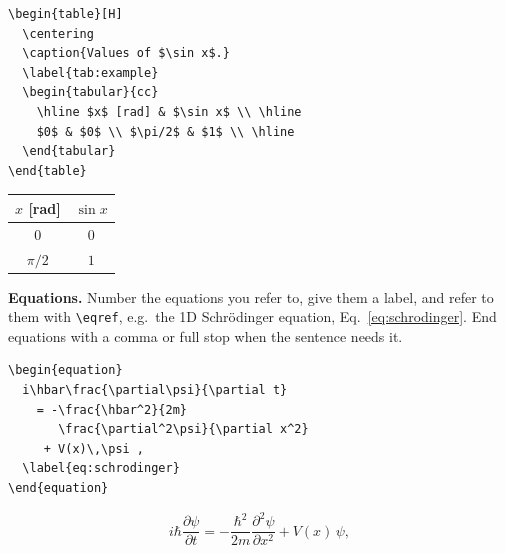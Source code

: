 \documentclass[a4paper,10pt,openany]{thesis}
\begin{document}
\begin{minipage}[t]{0.55\textwidth}
\vspace{0pt}
\begin{verbatim}
\begin{table}[H]
  \centering
  \caption{Values of $\sin x$.}
  \label{tab:example}
  \begin{tabular}{cc}
    \hline $x$ [rad] & $\sin x$ \\ \hline
    $0$ & $0$ \\ $\pi/2$ & $1$ \\ \hline
  \end{tabular}
\end{table}
\end{verbatim}
\end{minipage}%
\begin{minipage}[t]{0.45\textwidth}
\vspace{0pt}
\centering
{}
\label{tab:example}
\begin{tabular}{cc}
\hline
$x$ [rad] & $\sin x$ \\
\hline
$0$     & $0$ \\
$\pi/2$ & $1$ \\
\hline
\end{tabular}
\end{minipage}

\medskip
\textbf{Equations.} Number the equations you refer to, give them a label, and refer to them with \verb|\eqref|, e.g.\ the 1D Schrödinger equation, Eq.~\eqref{eq:schrodinger}. End equations with a comma or full stop when the sentence needs it.

\begin{minipage}[t]{0.55\textwidth}
\vspace{0pt}
\begin{verbatim}
\begin{equation}
  i\hbar\frac{\partial\psi}{\partial t}
    = -\frac{\hbar^2}{2m}
       \frac{\partial^2\psi}{\partial x^2}
     + V(x)\,\psi ,
  \label{eq:schrodinger}
\end{equation}
\end{verbatim}
\end{minipage}%
\begin{minipage}[t]{0.45\textwidth}
\vspace{-4pt}
\begin{equation}
  i\hbar\frac{\partial\psi}{\partial t} = -\frac{\hbar^2}{2m}\frac{\partial^2\psi}{\partial x^2} + V(x)\,\psi ,
  \label{eq:schrodinger}
\end{equation}
\end{minipage}

\begingroup
\makeatletter
\renewcommand{\chapter}{\@ifstar{\section*}{\section}}
\makeatother
\footnotesize


\endgroup
\end{document}
